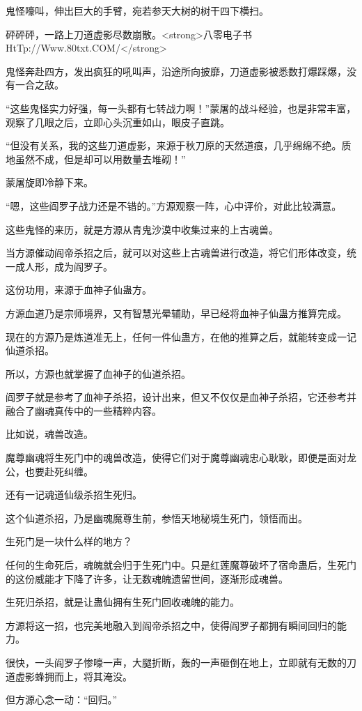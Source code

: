 \begin{this_body}
鬼怪嚎叫，伸出巨大的手臂，宛若参天大树的树干四下横扫。

砰砰砰，一路上刀道虚影尽数崩散。<strong>八零电子书HtTp://Www.80txt.COM/</strong>

鬼怪奔赴四方，发出疯狂的吼叫声，沿途所向披靡，刀道虚影被悉数打爆踩爆，没有一合之敌。

“这些鬼怪实力好强，每一头都有七转战力啊！”蒙屠的战斗经验，也是非常丰富，观察了几眼之后，立即心头沉重如山，眼皮子直跳。

“但没有关系，我的这些刀道虚影，来源于秋刀原的天然道痕，几乎绵绵不绝。质地虽然不成，但是却可以用数量去堆砌！”

蒙屠旋即冷静下来。

“嗯，这些阎罗子战力还是不错的。”方源观察一阵，心中评价，对此比较满意。

这些鬼怪的来历，就是方源从青鬼沙漠中收集过来的上古魂兽。

当方源催动阎帝杀招之后，就可以对这些上古魂兽进行改造，将它们形体改变，统一成人形，成为阎罗子。

这份功用，来源于血神子仙蛊方。

方源血道乃是宗师境界，又有智慧光晕辅助，早已经将血神子仙蛊方推算完成。

现在的方源乃是炼道准无上，任何一件仙蛊方，在他的推算之后，就能转变成一记仙道杀招。

所以，方源也就掌握了血神子的仙道杀招。

阎罗子就是参考了血神子杀招，设计出来，但又不仅仅是血神子杀招，它还参考并融合了幽魂真传中的一些精粹内容。

比如说，魂兽改造。

魔尊幽魂将生死门中的魂兽改造，使得它们对于魔尊幽魂忠心耿耿，即便是面对龙公，也要赴死纠缠。

还有一记魂道仙级杀招生死归。

这个仙道杀招，乃是幽魂魔尊生前，参悟天地秘境生死门，领悟而出。

生死门是一块什么样的地方？

任何的生命死后，魂魄就会归于生死门中。只是红莲魔尊破坏了宿命蛊后，生死门的这份威能才下降了许多，让无数魂魄遗留世间，逐渐形成魂兽。

生死归杀招，就是让蛊仙拥有生死门回收魂魄的能力。

方源将这一招，也完美地融入到阎帝杀招之中，使得阎罗子都拥有瞬间回归的能力。

很快，一头阎罗子惨嚎一声，大腿折断，轰的一声砸倒在地上，立即就有无数的刀道虚影蜂拥而上，将其淹没。

但方源心念一动：“回归。”


\end{this_body}
